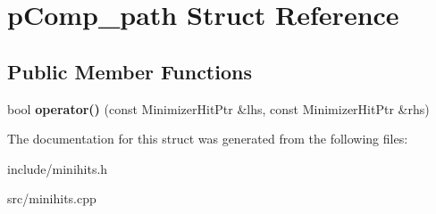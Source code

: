 \hypertarget{structpComp__path}{}\section{p\+Comp\+\_\+path Struct Reference}
\label{structpComp__path}
\subsection*{Public Member Functions}
\begin{DoxyCompactItemize}
\item 
\mbox{\label{structpComp__path_a60987a68b6b2fed0e213da00499fe212}} 
bool {\bfseries operator()} (const Minimizer\+Hit\+Ptr \&lhs, const Minimizer\+Hit\+Ptr \&rhs)
\end{DoxyCompactItemize}


The documentation for this struct was generated from the following files\+:\begin{DoxyCompactItemize}
\item 
include/minihits.\+h\item 
src/minihits.\+cpp\end{DoxyCompactItemize}
